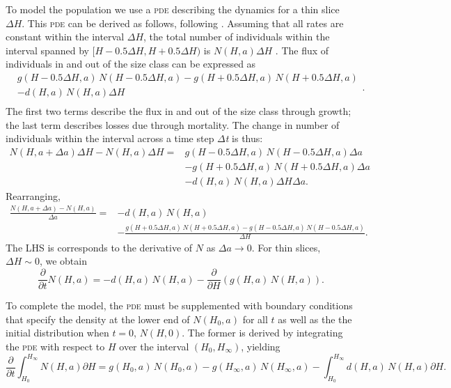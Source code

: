 \documentclass[10pt,twoside]{article}
\begin{document}
To model the population we use a \textsc{pde} describing the dynamics for a thin
slice \(\Delta H\). This \textsc{pde} can be derived as follows, following
\citet{Deroos-1997}. Assuming that all rates are constant within the
interval \(\Delta H\), the total number of individuals within the
interval spanned by \([H - 0.5\Delta H, H + 0.5\Delta H)\) is
\(N(H, a)\Delta H\) . The flux of individuals in and out of the size
class can be expressed as
\begin{equation}\begin{array}{ll} &g(H - 0.5 \Delta H, a) \, N(H - 0.5 \Delta H, a) - g(H + 0.5 \Delta H, a) \, N(H + 0.5 \Delta H, a) \\ & - d (H, a) \, N(H, a)\Delta H\\ \end{array}.
\end{equation}
The first two terms describe the flux in and out of the size class
through growth; the last term describes losses due through mortality.
The change in number of individuals within the interval across a time
step \textit{$\Delta $t} is thus:
\begin{equation}
  \begin{array}{ll} N(H, a + \Delta a)\Delta H - N(H, a)\Delta H = &g(H - 0.5 \Delta H, a) \, N(H - 0.5 \Delta H, a)\Delta a \\ & - g(H + 0.5 \Delta H, a) \, N(H + 0.5 \Delta H, a)\Delta a\\& - d (H, a) \, N(H, a)\Delta H\Delta a.
  \end{array}
\end{equation}
Rearranging,
\begin{equation}
  \begin{array}{ll}
  \frac{N(H, a + \Delta a) - N(H, a)}{\Delta a} = & - d (H, a) \, N(H, a) \\
  & - \frac{g(H + 0.5 \Delta H, a) \, N(H + 0.5 \Delta H, a) - g(H - 0.5 \Delta H, a) \, N(H - 0.5 \Delta H, a)}{\Delta H}.
  \end{array}
\end{equation}
The LHS is corresponds to the derivative of \(N\) as \(\Delta a\to 0\).
For thin slices, \(\Delta H \sim 0\), we obtain
\begin{equation} \label{eq:PDE-app}
  \frac{\partial}{\partial t} N(H, a) = - d (H, a) \, N(H, a) - \frac{\partial}{\partial H} (g(H, a) \, N(H, a)).
\end{equation}

To complete the model, the \textsc{pde} must be supplemented with boundary
conditions that specify the density at the lower end of \(N(H_{0}, a)\)
for all \(t\) as well as the the initial distribution when \(t = 0\),
\(N(H,0)\). The former is derived by integrating the \textsc{pde} with respect to
\(H\) over the interval \((H_{0}, H_{\infty} )\), yielding
\begin{equation}\frac{\partial}{\partial t} \int _{H_{0} }^{H_{\infty}}N(H, a) \partial H = g(H_{0} , a) \, N(H_{0} , a) - g(H_{\infty}, a) \, N(H_{\infty}, a) - \int _{H_{0} }^{H_{\infty}}d (H, a) \, N(H, a) \partial H.
\end{equation}
\end{document}
